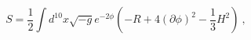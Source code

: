 \begin{equation}
 S =\frac{1}{2} \int d^{10} x \sqrt{-g} e^{-2 \phi} 
     ( - R + 4 (\partial \phi)^2 - \frac{1}{3} H^2) ~,
\end{equation} 
